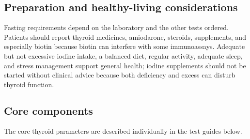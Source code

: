 \documentclass[11pt,openany]{book}
\begin{document}
\subsection*{Preparation and healthy-living considerations}
Fasting requirements depend on the laboratory and the other tests ordered.
Patients should
report thyroid medicines, amiodarone, steroids, supplements, and especially
biotin because biotin can interfere with some immunoassays. Adequate but not
excessive iodine intake, a balanced diet, regular activity, adequate sleep, and
stress management support general health; iodine supplements should not be
started without clinical advice because both deficiency and excess can disturb
thyroid function.

\subsection*{Core components}
The core thyroid parameters are described individually in the test guides below.

\end{document}
